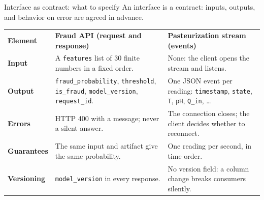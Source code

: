 \begin{cframe}{Interface as contract: what to specify}{}
\centering
{\small An interface is a contract: inputs, outputs, and behavior on error are agreed in advance.}\par\vspace{0.4em}
\renewcommand{\arraystretch}{1.1}
\setlength{\tabcolsep}{5pt}
{\scriptsize
\begin{tabularx}{\textwidth}{>{\raggedright\arraybackslash}p{1.9cm} >{\raggedright\arraybackslash}X >{\raggedright\arraybackslash}X}
\rowcolor{courseblue}
\color{white}\textbf{Element} & \color{white}\textbf{Fraud API (request and response)} & \color{white}\textbf{Pasteurization stream (events)} \\
\textbf{Input} & A \texttt{features} list of 30 finite numbers in a fixed order. & None: the client opens the stream and listens. \\
\rowcolor{courseice}
\textbf{Output} & \texttt{fraud\_probability}, \texttt{threshold}, \texttt{is\_fraud}, \texttt{model\_version}, \texttt{request\_id}. & One JSON event per reading: \texttt{timestamp}, \texttt{state}, \texttt{T}, \texttt{pH}, \texttt{Q\_in}, \dots \\
\textbf{Errors} & HTTP 400 with a message; never a silent answer. & The connection closes; the client decides whether to reconnect. \\
\rowcolor{courseice}
\textbf{Guarantees} & The same input and artifact give the same probability. & One reading per second, in time order. \\
\textbf{Versioning} & \texttt{model\_version} in every response. & No version field: a column change breaks consumers silently. \\
\end{tabularx}}

\vspace{0.3em}
\coursefooter
\end{cframe}

